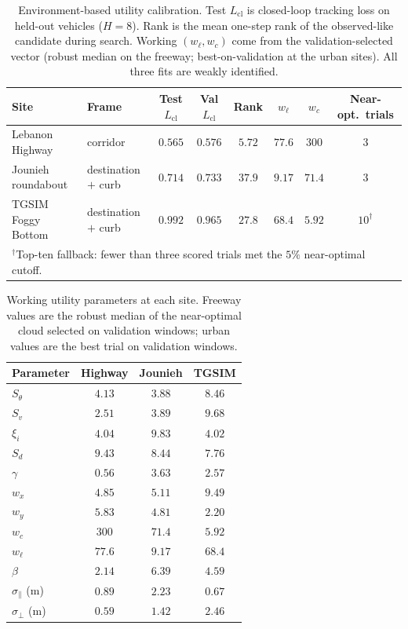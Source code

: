 \documentclass[conference]{IEEEtran}
\begin{document}

\begin{table}[t]
\centering
\caption{Environment-based utility calibration. Test $L_{\mathrm{cl}}$ is closed-loop tracking loss on held-out vehicles ($H=8$). Rank is the mean one-step rank of the observed-like candidate during search. Working $(w_{\ell},w_{c})$ come from the validation-selected vector (robust median on the freeway; best-on-validation at the urban sites). All three fits are weakly identified.}
\label{tab:app_env_calib}
\small
\begin{tabular}{llcccccc}
\toprule
Site & Frame & Test $L_{\mathrm{cl}}$ & Val $L_{\mathrm{cl}}$ & Rank & $w_{\ell}$ & $w_{c}$ & Near-opt.\ trials \\
\midrule
Lebanon Highway      & corridor              & $0.565$ & $0.576$ & $5.72$  & $77.6$ & $300$ & $3$ \\
Jounieh roundabout   & destination $+$ curb  & $0.714$ & $0.733$ & $37.9$  & $9.17$ & $71.4$ & $3$ \\
TGSIM Foggy Bottom   & destination $+$ curb  & $0.992$ & $0.965$ & $27.8$  & $68.4$ & $5.92$ & $10^{\dagger}$ \\
\bottomrule
\multicolumn{8}{l}{\footnotesize $^{\dagger}$Top-ten fallback: fewer than three scored trials met the $5\%$ near-optimal cutoff.}
\end{tabular}
\end{table}

\begin{table}[t]
\centering
\caption{Working utility parameters at each site. Freeway values are the robust median of the near-optimal cloud selected on validation windows; urban values are the best trial on validation windows.}
\label{tab:app_env_params}
\scriptsize
\begin{tabular}{lccc}
\toprule
Parameter & Highway & Jounieh & TGSIM \\
\midrule
$S_{\theta}$ & $4.13$ & $3.88$ & $8.46$ \\
$S_{v}$ & $2.51$ & $3.89$ & $9.68$ \\
$\xi_{i}$ & $4.04$ & $9.83$ & $4.02$ \\
$S_{d}$ & $9.43$ & $8.44$ & $7.76$ \\
$\gamma$ & $0.56$ & $3.63$ & $2.57$ \\
$w_{x}$ & $4.85$ & $5.11$ & $9.49$ \\
$w_{y}$ & $5.83$ & $4.81$ & $2.20$ \\
$w_{c}$ & $300$ & $71.4$ & $5.92$ \\
$w_{\ell}$ & $77.6$ & $9.17$ & $68.4$ \\
$\beta$ & $2.14$ & $6.39$ & $4.59$ \\
$\sigma_{\parallel}$ (m) & $0.89$ & $2.23$ & $0.67$ \\
$\sigma_{\perp}$ (m) & $0.59$ & $1.42$ & $2.46$ \\
\bottomrule
\end{tabular}
\end{table}
\end{document}
